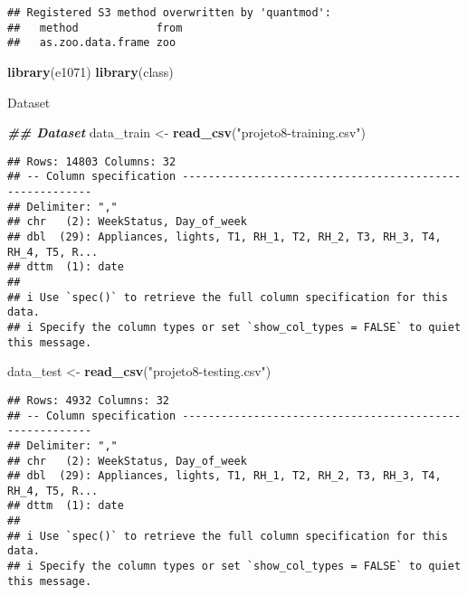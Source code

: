 \documentclass[
]{article}
\newenvironment{Shaded}{\begin{snugshade}}{\end{snugshade}}
\newcommand{\DocumentationTok}[1]{\textcolor[rgb]{0.56,0.35,0.01}{\textbf{\textit{#1}}}}
\newcommand{\FunctionTok}[1]{\textcolor[rgb]{0.13,0.29,0.53}{\textbf{#1}}}
\newcommand{\NormalTok}[1]{#1}
\newcommand{\OtherTok}[1]{\textcolor[rgb]{0.56,0.35,0.01}{#1}}
\newcommand{\StringTok}[1]{\textcolor[rgb]{0.31,0.60,0.02}{#1}}
\begin{document}
\begin{verbatim}
## Registered S3 method overwritten by 'quantmod':
##   method            from
##   as.zoo.data.frame zoo
\end{verbatim}

\begin{Shaded}
\begin{Highlighting}[]
\FunctionTok{library}\NormalTok{(e1071)}
\FunctionTok{library}\NormalTok{(class)}
\end{Highlighting}
\end{Shaded}

Dataset

\begin{Shaded}
\begin{Highlighting}[]
\DocumentationTok{\#\# Dataset}
\NormalTok{data\_train }\OtherTok{\textless{}{-}} \FunctionTok{read\_csv}\NormalTok{(}\StringTok{"projeto8{-}training.csv"}\NormalTok{)}
\end{Highlighting}
\end{Shaded}

\begin{verbatim}
## Rows: 14803 Columns: 32
## -- Column specification --------------------------------------------------------
## Delimiter: ","
## chr   (2): WeekStatus, Day_of_week
## dbl  (29): Appliances, lights, T1, RH_1, T2, RH_2, T3, RH_3, T4, RH_4, T5, R...
## dttm  (1): date
## 
## i Use `spec()` to retrieve the full column specification for this data.
## i Specify the column types or set `show_col_types = FALSE` to quiet this message.
\end{verbatim}

\begin{Shaded}
\begin{Highlighting}[]
\NormalTok{data\_test }\OtherTok{\textless{}{-}} \FunctionTok{read\_csv}\NormalTok{(}\StringTok{"projeto8{-}testing.csv"}\NormalTok{)}
\end{Highlighting}
\end{Shaded}

\begin{verbatim}
## Rows: 4932 Columns: 32
## -- Column specification --------------------------------------------------------
## Delimiter: ","
## chr   (2): WeekStatus, Day_of_week
## dbl  (29): Appliances, lights, T1, RH_1, T2, RH_2, T3, RH_3, T4, RH_4, T5, R...
## dttm  (1): date
## 
## i Use `spec()` to retrieve the full column specification for this data.
## i Specify the column types or set `show_col_types = FALSE` to quiet this message.
\end{verbatim}
\end{document}
